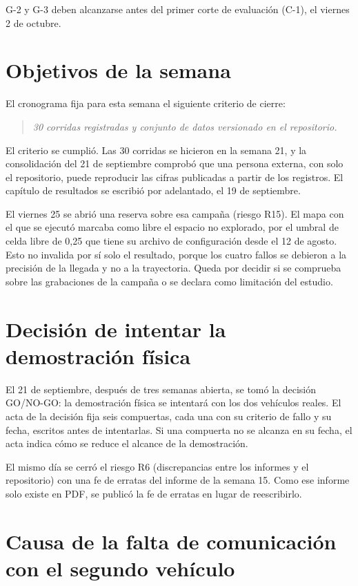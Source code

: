 \documentclass[12pt,letterpaper]{article}
\begin{document}
G-2 y G-3 deben alcanzarse antes del primer corte de evaluación (C-1), el viernes 2 de octubre.

\section{Objetivos de la semana}
\label{sec:objetivos}

El cronograma fija para esta semana el siguiente criterio de cierre:

\begin{quote}
\textit{30 corridas registradas y conjunto de datos versionado en el repositorio.}
\end{quote}

El criterio se cumplió. Las 30 corridas se hicieron en la semana 21, y la consolidación del 21 de septiembre comprobó que una persona externa, con solo el repositorio, puede reproducir las cifras publicadas a partir de los registros. El capítulo de resultados se escribió por adelantado, el 19 de septiembre.

El viernes 25 se abrió una reserva sobre esa campaña (riesgo R15). El mapa con el que se ejecutó marcaba como libre el espacio no explorado, por el umbral de celda libre de 0,25 que tiene su archivo de configuración desde el 12 de agosto. Esto no invalida por sí solo el resultado, porque los cuatro fallos se debieron a la precisión de la llegada y no a la trayectoria. Queda por decidir si se comprueba sobre las grabaciones de la campaña o se declara como limitación del estudio.

\section{Decisión de intentar la demostración física}
\label{sec:decision}

El 21 de septiembre, después de tres semanas abierta, se tomó la decisión GO/NO-GO: la demostración física se intentará con los dos vehículos reales. El acta de la decisión fija seis compuertas, cada una con su criterio de fallo y su fecha, escritos antes de intentarlas. Si una compuerta no se alcanza en su fecha, el acta indica cómo se reduce el alcance de la demostración.

El mismo día se cerró el riesgo R6 (discrepancias entre los informes y el repositorio) con una fe de erratas del informe de la semana 15. Como ese informe solo existe en PDF, se publicó la fe de erratas en lugar de reescribirlo.

\section{Causa de la falta de comunicación con el segundo vehículo}
\label{sec:causa}
\end{document}
